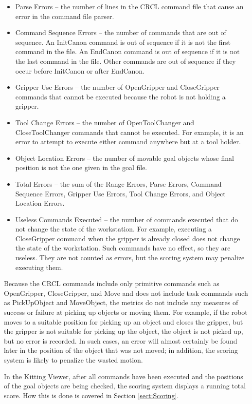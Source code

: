 \begin{itemize}
\item \small \sf Parse Errors \rm \normalsize -- the number of lines in
the CRCL command file that cause an error in the command file
parser.

\item \small \sf Command Sequence Errors \rm \normalsize -- the number of
commands that are out of sequence. An InitCanon command is out of sequence
if it is not the first command in the file. An EndCanon command is out of
sequence if it is not the last command in the file. Other commands are out
of sequence if they occur before InitCanon or after EndCanon.

\item \small \sf Gripper Use Errors \rm \normalsize -- the number of
OpenGripper and CloseGripper commands that cannot be executed because the
robot is not holding a gripper.

\item \small \sf Tool Change Errors \rm \normalsize -- the number of
OpenToolChanger and CloseToolChanger commands that cannot be executed. For
example, it is an error to attempt to execute either command anywhere but
at a tool holder.

\item \small \sf Object Location Errors \rm \normalsize -- the number of
movable goal objects whose final position is not the one given in the goal
file.

\item \small \sf Total Errors \rm \normalsize -- the sum of the Range
Errors, Parse Errors, Command Sequence Errors, Gripper Use Errors, Tool
Change Errors, and Object Location Errors.

\item \small \sf Useless Commands Executed \rm \normalsize -- the number
of commands executed that do not change the state of the workstation. For
example, executing a CloseGripper command when the gripper is already
closed does not change the state of the workstation. Such commands have no
effect, so they are useless. They are not counted as errors, but the
scoring system may penalize executing them.

\end{itemize}

Because the CRCL commands include only primitive commands such as
OpenGripper, CloseGripper, and Move and does not include task commands such
as PickUpObject and MoveObject, the metrics do not include any measures of
success or failure at picking up objects or moving them. For example, if
the robot moves to a suitable position for picking up an object and closes
the gripper, but the gripper is not suitable for picking up the object, the
object is not picked up, but no error is recorded. In such cases, an error
will almost certainly be found later in the position of the object that was
not moved; in addition, the scoring system is likely to penalize the wasted
motion.

In the Kitting Viewer, after all commands have been executed and the
positions of the goal objects are being checked, the scoring system
displays a running total score. How this is done is covered in
Section \ref{sect:Scoring}.

